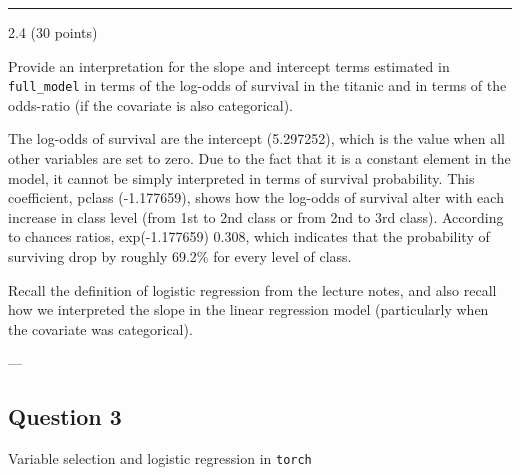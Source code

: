 \documentclass[
  letterpaper,
  DIV=11,
  numbers=noendperiod]{scrartcl}
\begin{document}
\begin{center}\rule{0.5\linewidth}{0.5pt}\end{center}

2.4 (30 points)

Provide an interpretation for the slope and intercept terms estimated in
\texttt{full\_model} in terms of the log-odds of survival in the titanic
and in terms of the odds-ratio (if the covariate is also categorical).

The log-odds of survival are the intercept (5.297252), which is the
value when all other variables are set to zero. Due to the fact that it
is a constant element in the model, it cannot be simply interpreted in
terms of survival probability. This coefficient, pclass (-1.177659),
shows how the log-odds of survival alter with each increase in class
level (from 1st to 2nd class or from 2nd to 3rd class). According to
chances ratios, exp(-1.177659) 0.308, which indicates that the
probability of surviving drop by roughly 69.2\% for every level of
class.

\begin{tcolorbox}[enhanced jigsaw, breakable, colframe=quarto-callout-color-frame, bottomtitle=1mm, leftrule=.75mm, bottomrule=.15mm, arc=.35mm, titlerule=0mm, coltitle=black, colback=white, colbacktitle=quarto-callout-color!10!white, opacitybacktitle=0.6, toptitle=1mm, opacityback=0, title={}, toprule=.15mm, left=2mm, rightrule=.15mm]

Recall the definition of logistic regression from the lecture notes, and
also recall how we interpreted the slope in the linear regression model
(particularly when the covariate was categorical).

\end{tcolorbox}

---

\hypertarget{question-3}{%
\subsection{Question 3}\label{question-3}}

\begin{tcolorbox}[enhanced jigsaw, breakable, colframe=quarto-callout-tip-color-frame, bottomtitle=1mm, leftrule=.75mm, bottomrule=.15mm, arc=.35mm, titlerule=0mm, coltitle=black, colback=white, colbacktitle=quarto-callout-tip-color!10!white, opacitybacktitle=0.6, toptitle=1mm, opacityback=0, title=\textcolor{quarto-callout-tip-color}{\faLightbulb}\hspace{0.5em}{70 points}, toprule=.15mm, left=2mm, rightrule=.15mm]

Variable selection and logistic regression in \texttt{torch}

\end{tcolorbox}
\end{document}
